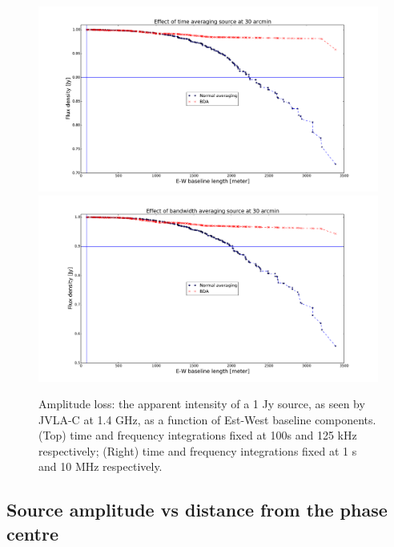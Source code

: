 \documentclass[useAMS,usenatbib]{mn2e}
\begin{document}
\begin{figure}
\includegraphics[width=.9\textwidth]{./Figures/time_bda_navg.pdf}\\
\includegraphics[width=.9\textwidth]{./Figures/bandwidth_bda_navg.pdf}
\caption{Amplitude loss: the apparent intensity of a 1 Jy source, as seen by JVLA-C at 1.4 GHz, 
as a function of Est-West baseline components. (Top) time and frequency integrations fixed at  100s and 125 kHz respectively; 
(Right) time and frequency integrations fixed at  1 s and 10 MHz respectively.}\label{fig:srcat30arcminx}
\end{figure}

\subsection{Source amplitude vs distance from the phase centre}
\end{document}
